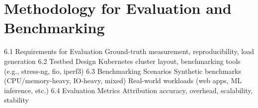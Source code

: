 \chapter{Methodology for Evaluation and Benchmarking} %
\label{Chapter6}

    6.1 Requirements for Evaluation
        Ground-truth measurement, reproducibility, load generation
    6.2 Testbed Design
        Kubernetes cluster layout, benchmarking tools (e.g., stress-ng, fio, iperf3)
    6.3 Benchmarking Scenarios
        Synthetic benchmarks (CPU/memory-heavy, IO-heavy, mixed)
        Real-world workloads (web apps, ML inference, etc.)
    6.4 Evaluation Metrics
        Attribution accuracy, overhead, scalability, stability